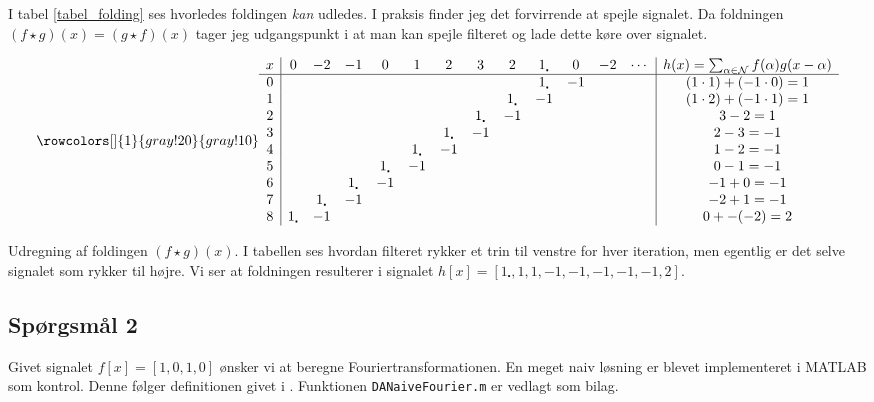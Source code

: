 \documentclass[a4paper, 10pt, danish, final]{article}
\begin{document}
I tabel \ref{tabel_folding} ses hvorledes foldingen
\emph{kan} udledes. I praksis finder jeg det forvirrende at spejle
signalet. Da foldningen $(f \star g)(x) = (g \star f)(x)$ tager jeg
udgangspunkt i at man kan spejle filteret og lade dette køre over
signalet.

\begin{table}[t]
    \begin{equation}
        \rowcolors[]{1}{gray!20}{gray!10}
        \begin{array}{c|cccccccccccc|c}
            x & 0 & -2 & -1 & 0 & 1 & 2 & 3 & 2 & 1_{\centerdot} & 0 & -2 & \cdots & h(x) = \sum_{\alpha \in \mathcal{N}}f(\alpha)g(x - \alpha)\\\hline
            0&&&&&&&&&1_\centerdot & -1 &&& (1\cdot 1) + (-1 \cdot 0) = 1\\
            1&&&&&&&&1_\centerdot & -1 &&&& (1\cdot 2) + (-1 \cdot 1) = 1\\
            2&&&&&&&1_\centerdot & -1 &&&&& 3 - 2 = 1\\
            3&&&&&&1_\centerdot & -1 &&&&&& 2 - 3 = -1\\
            4&&&&&1_\centerdot & -1 &&&&&&& 1 - 2 = -1\\
            5&&&&1_\centerdot & -1 &&&&&&&& 0 - 1 = -1\\
            6&&&1_\centerdot & -1 &&&&&&&&& -1 + 0 = -1\\
            7&&1_\centerdot & -1 &&&&&&&&&& -2 + 1 = -1\\
            8&1_\centerdot & -1 &&&&&&&&&&& 0 + -(-2) = 2
        \end{array}\nonumber
    \end{equation}
    \caption{Udregning af foldingen $(f \star g)(x)$. I tabellen ses
    hvordan filteret rykker et trin til venstre for hver iteration, men
    egentlig er det selve signalet som rykker til højre. Vi ser at
    foldningen resulterer i signalet $h[x] = [1_\centerdot, 1, 1, -1,
    -1, -1, -1, -1,
    2]$.}
    \label{tabel_folding}
\end{table}

\subsection*{Spørgsmål 2}
Givet signalet $f[x] = [1, 0, 1, 0]$ ønsker vi at beregne
Fouriertransformationen. En meget naiv løsning er blevet implementeret i
MATLAB som kontrol. Denne følger definitionen givet i \citep[ligning
2.14, s. 16]{soereninout}. Funktionen \texttt{DANaiveFourier.m} er
vedlagt som bilag.
\end{document}

